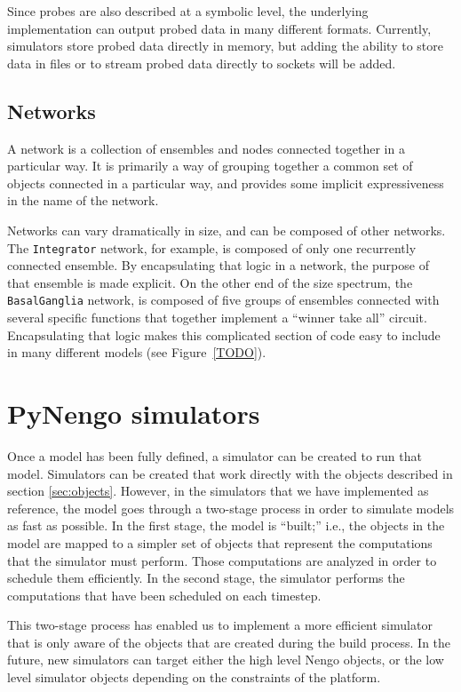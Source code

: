 \documentclass{frontiersSCNS}
\begin{document}
Since probes are also described
at a symbolic level,
the underlying implementation
can output probed data in many different formats.
Currently, simulators store probed data
directly in memory,
but adding the ability to store data
in files or to stream probed data
directly to sockets will be added.

\subsection{Networks}
A network is a collection of ensembles and nodes
connected together in a particular way.
It is primarily a way of grouping together
a common set of objects connected in a particular way,
and provides some implicit expressiveness
in the name of the network.

Networks can vary dramatically in size,
and can be composed of other networks.
The \texttt{Integrator} network, for example,
is composed of only one recurrently connected ensemble.
By encapsulating that logic in a network,
the purpose of that ensemble is made explicit.
On the other end of the size spectrum,
the \texttt{BasalGanglia} network,
is composed of five groups of ensembles
connected with several specific functions
that together implement a ``winner take all'' circuit.
Encapsulating that logic
makes this complicated section of code
easy to include in many different models
(see Figure~\ref{TODO}).

\section{PyNengo simulators} \label{sec:simulators}

Once a model has been fully defined,
a simulator can be created to
run that model.
Simulators can be created
that work directly with the
objects described in section \ref{sec:objects}.
However, in the simulators that we have implemented
as reference, the model goes through a
two-stage process in order to
simulate models as fast as possible.
In the first stage,
the model is ``built;''
i.e., the objects in the model are mapped to a simpler
set of objects that represent the computations
that the simulator must perform.
Those computations are analyzed in order to
schedule them efficiently.
In the second stage,
the simulator performs the computations
that have been scheduled on each timestep.

This two-stage process has enabled us
to implement a more efficient simulator
that is only aware of
the objects that are created
during the build process.
In the future,
new simulators can target either
the high level Nengo objects,
or the low level simulator objects
depending on the constraints of the platform.
\end{document}
